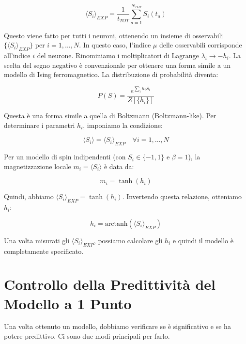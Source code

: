\begin{equation} \label{eq:ch23_3}
\langle S_i \rangle_{EXP} = \frac{1}{t_{TOT}} \sum_{a=1}^{N_{TOT}} S_i(t_a)
\end{equation}

Questo viene fatto per tutti i neuroni, ottenendo un insieme di osservabili $\{\langle S_i \rangle_{EXP}\}$ per $i=1, \dots, N$.
In questo caso, l'indice $\mu$ delle osservabili corrisponde all'indice $i$ del neurone.
Rinominiamo i moltiplicatori di Lagrange $\lambda_i \rightarrow -h_i$. La scelta del segno negativo è convenzionale per ottenere una forma simile a un modello di Ising ferromagnetico.
La distribuzione di probabilità diventa:

\begin{equation} \label{eq:ch23_4}
P(S) = \frac{e^{\sum_i h_i S_i}}{Z[\{h_i\}]}
\end{equation}

Questa è una forma simile a quella di Boltzmann (Boltzmann-like).
Per determinare i parametri $h_i$, imponiamo la condizione:

\begin{equation} \label{eq:ch23_5}
\langle S_i \rangle = \langle S_i \rangle_{EXP} \quad \forall i=1, \dots, N
\end{equation}

Per un modello di spin indipendenti (con $S_i \in \{-1,1\}$ e $\beta=1$), la magnetizzazione locale $m_i = \langle S_i \rangle$ è data da:

\begin{equation} \label{eq:ch23_6}
m_i = \tanh(h_i)
\end{equation}

Quindi, abbiamo $\langle S_i \rangle_{EXP} = \tanh(h_i)$. Invertendo questa relazione, otteniamo $h_i$:

\begin{equation} \label{eq:ch23_7}
h_i = \text{arctanh}(\langle S_i \rangle_{EXP})
\end{equation}

Una volta misurati gli $\langle S_i \rangle_{EXP}$, possiamo calcolare gli $h_i$ e quindi il modello è completamente specificato.


\section{Controllo della Predittività del Modello a 1 Punto}
Una volta ottenuto un modello, dobbiamo verificare se è significativo e se ha potere predittivo. Ci sono due modi principali per farlo.

